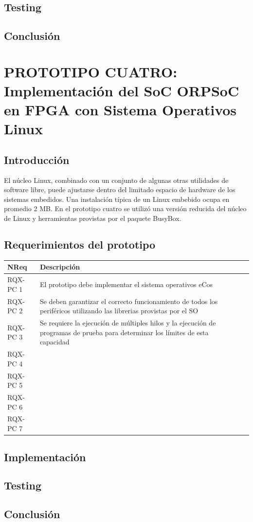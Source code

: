 		\subsection{Testing}
		
		\subsection{Conclusión}


\newpage
				
	\section{PROTOTIPO CUATRO: Implementación del SoC ORPSoC en FPGA con Sistema Operativos Linux}
		\subsection{Introducción}
		El núcleo Linux, combinado con un conjunto de algunas otras utilidades de software libre, puede ajustarse dentro del limitado espacio de hardware 
	    de los sistemas embedidos. Una instalación típica de un Linux embebido ocupa en promedio 2 MB. En el prototipo cuatro se utilizó una versión
	    reducida del núcleo de Linux y herramientas provistas por el paquete BusyBox. 
		
		\subsection{Requerimientos del prototipo}
		
		\begin{table}[h]
		\centering	
		\begin{tabular}{ p{2.5cm} p{8cm} p{3cm} }
		\hline 
		\rowcolor[gray]{0.8} N\textordmasculine Req & Descripción\\
		\hline 
		RQX-PC 1 & El prototipo debe implementar el sistema operativos eCos\\ 
		\hline 
		RQX-PC 2 & Se deben garantizar el correcto funcionamiento de todos los periféricos utilizando las librerias provistas por el SO\\ 
		\hline 
		RQX-PC 3 & Se requiere la ejecución de múltiples hilos y la ejecución de programas de prueba para determinar los límites de esta capacidad \\ 
		\hline
		RQX-PC 4 & \\
		\hline
		RQX-PC 5 & \\
		\hline
		RQX-PC 6 & \\
		\hline
		RQX-PC 7 & \\
		\hline		
		\end{tabular}
		\end{table}
		
		
		\subsection{Implementación}
		
		\subsection{Testing}
		
		\subsection{Conclusión}
